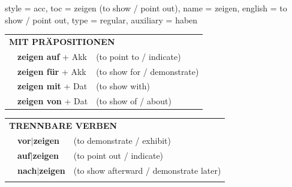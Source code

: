 \begin{verbentry}{
  style = {acc},
  toc = {zeigen (to show / point out)},
  name = {zeigen},
  english = {to show / point out},
  type = {regular},
  auxiliary = {haben}
}
 \vspace{10pt}

\begin{tabular}{lll}
      \multicolumn{3}{l}{\textbf{MIT PRÄPOSITIONEN}}\\
& \textbf{zeigen auf} + Akk & (to point to / indicate)\\
& \textbf{zeigen für} + Akk & (to show for / demonstrate)\\
& \textbf{zeigen mit} + Dat & (to show with)\\
& \textbf{zeigen von} + Dat & (to show of / about)\\
\end{tabular}
  \hfill
\begin{tabular}{lll}
      \multicolumn{3}{l}{\textbf{TRENNBARE VERBEN}}\\
 & \textbf{vor$|$zeigen} & (to demonstrate / exhibit)\\
 & \textbf{auf$|$zeigen} & (to point out / indicate)\\
 & \textbf{nach$|$zeigen} & (to show afterward / demonstrate later)\\
\vspace{10pt}
  \end{tabular}
  
  \vspace{-5pt}
\end{verbentry}

